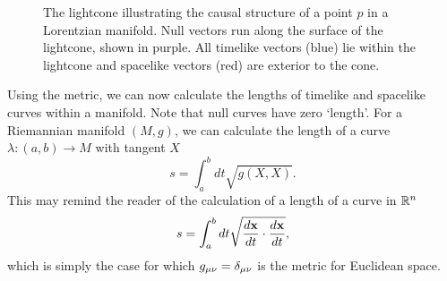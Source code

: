 \begin{figure}[!h]
\centering

\caption[Illustration of the Minkowski lightcone]{The lightcone illustrating the causal structure of a point $p$ in a Lorentzian manifold. Null vectors run along the surface of the lightcone, shown in purple. All timelike vectors (blue) lie within the lightcone and spacelike vectors (red) are exterior to the cone.}
\end{figure}


Using the metric, we can now calculate the lengths of timelike and spacelike curves within a manifold. Note that null curves have zero `length'. For a Riemannian manifold $(M,g)$, we can calculate the length of a curve $\lambda: (a,b) \rightarrow M$ with tangent $X$
\begin{equation}
\label{eq:riemlen}
  s = \int^b_a  dt \sqrt{g(X,X)} .
\end{equation}
This may remind the reader of the calculation of a length of a curve in ${\mathbb{R}}^n$
\begin{equation*}
  s = \int^b_a  dt \sqrt{ \frac{d \mathbf{x}}{d t} \cdot \frac{d \mathbf{x}}{d t} } ,
\end{equation*}
which is simply the case for which ${g_{\mu\nu}} = \delta_{\mu \nu}$ is the metric for Euclidean space.

